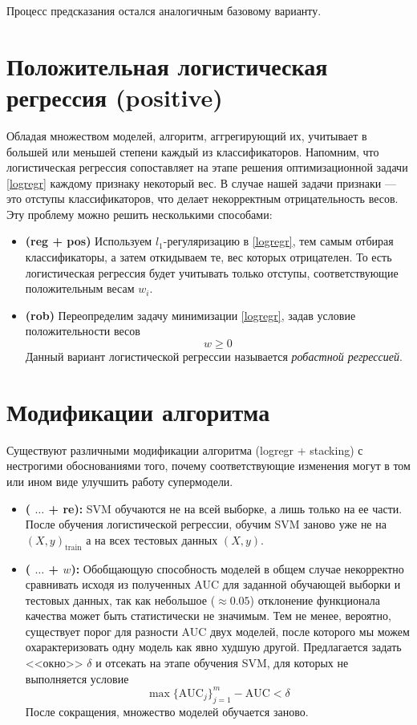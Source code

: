 \documentclass[12pt,twoside]{article}
\theoremstyle{plain}
\theoremstyle{remark}
\theoremstyle{definition}
\begin{document}
Процесс предсказания остался аналогичным базовому варианту. 

\section{Положительная логистическая регрессия (positive)}

Обладая множеством моделей, алгоритм, аггрегирующий их, учитывает в большей или меньшей степени каждый из классификаторов. Напомним, что логистическая регрессия сопоставляет на этапе решения оптимизационной задачи \ref{logregr} каждому признаку некоторый вес. В случае нашей задачи признаки --- это отступы классификаторов, что делает некорректным отрицательность весов. Эту проблему можно решить несколькими способами:
\begin{itemize}
	\item \textbf{(reg + pos)} Используем $l_1$-регуляризацию в \ref{logregr}, тем самым отбирая классификаторы, а затем откидываем те, вес которых отрицателен. То есть логистическая регрессия будет учитывать только отступы, соответствующие положительным весам $w_i$.
	\item \textbf{(rob)} Переопределим задачу минимизации \ref{logregr}, задав условие положительности весов 
	$$
	w \geq 0
	$$
	Данный вариант логистической регрессии называется \emph{робастной регрессией}.
\end{itemize}

\section{Модификации алгоритма}

Существуют различными модификации алгоритма (logregr + stacking) с нестрогими обоснованиями того, почему соответствующие изменения могут в том или ином виде улучшить работу супермодели. 

\begin{itemize}
	\item \textbf{( $\ldots$ + re):} SVM обучаются не на всей выборке, а лишь только на ее части. После обучения логистической регрессии, обучим SVM заново уже не на $(X, y)_\text{train}$ а на всех тестовых данных $(X, y)$.
	\item \textbf{( $\ldots$ + $w$):} Обобщающую способность моделей в общем случае некорректно сравнивать исходя из полученных AUC для заданной обучающей выборки и тестовых данных, так как небольшое ($\approx 0.05$) отклонение функционала качества может быть статистически не значимым. Тем не менее, вероятно, существует порог для разности AUC двух моделей, после которого мы можем охарактеризовать одну модель как явно худшую другой. Предлагается задать <<окно>> $\delta$ и отсекать на этапе обучения SVM, для которых не выполняется условие
	$$
	\max\{\mathrm{AUC}_j\}_{j=1}^m - \mathrm{AUC} < \delta
	$$
	После сокращения, множество моделей обучается заново.
\end{itemize}
\end{document}
